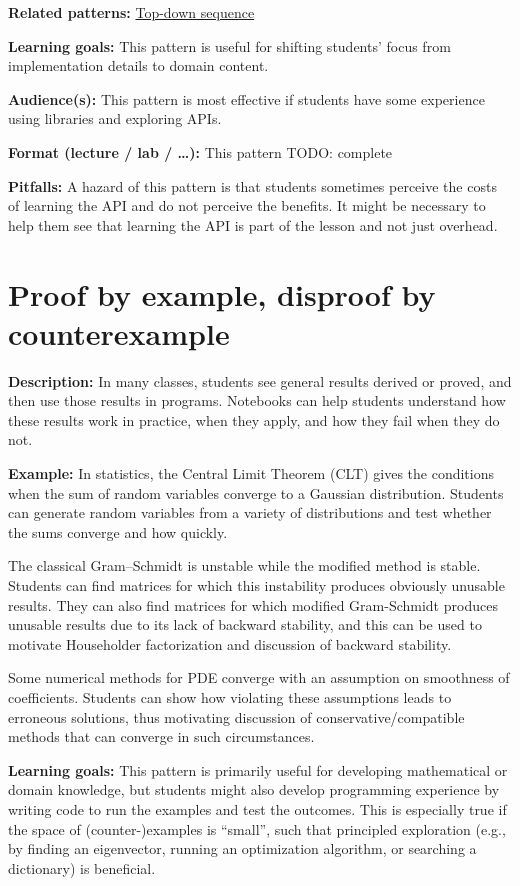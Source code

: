 \documentclass[]{book}
\begin{document}
\textbf{Related patterns:}
\protect\hyperlink{top-down-sequence}{Top-down sequence}

\textbf{Learning goals:} This pattern is useful for shifting students'
focus from implementation details to domain content.

\textbf{Audience(s):} This pattern is most effective if students have
some experience using libraries and exploring APIs.

\textbf{Format (lecture / lab / \ldots{}):} This pattern TODO: complete

\textbf{Pitfalls:} A hazard of this pattern is that students sometimes
perceive the costs of learning the API and do not perceive the benefits.
It might be necessary to help them see that learning the API is part of
the lesson and not just overhead.

\hypertarget{proof-by-example-disproof-by-counterexample}{\section{Proof
by example, disproof by
counterexample}\label{proof-by-example-disproof-by-counterexample}}

\textbf{Description:} In many classes, students see general results
derived or proved, and then use those results in programs. Notebooks can
help students understand how these results work in practice, when they
apply, and how they fail when they do not.

\textbf{Example:} In statistics, the Central Limit Theorem (CLT) gives
the conditions when the sum of random variables converge to a Gaussian
distribution. Students can generate random variables from a variety of
distributions and test whether the sums converge and how quickly.

The classical Gram--Schmidt is unstable while the modified method is
stable. Students can find matrices for which this instability produces
obviously unusable results. They can also find matrices for which
modified Gram-Schmidt produces unusable results due to its lack of
backward stability, and this can be used to motivate Householder
factorization and discussion of backward stability.

Some numerical methods for PDE converge with an assumption on smoothness
of coefficients. Students can show how violating these assumptions leads
to erroneous solutions, thus motivating discussion of
conservative/compatible methods that can converge in such circumstances.

\textbf{Learning goals:} This pattern is primarily useful for developing
mathematical or domain knowledge, but students might also develop
programming experience by writing code to run the examples and test the
outcomes. This is especially true if the space of (counter-)examples is
``small'', such that principled exploration (e.g., by finding an
eigenvector, running an optimization algorithm, or searching a
dictionary) is beneficial.
\end{document}
